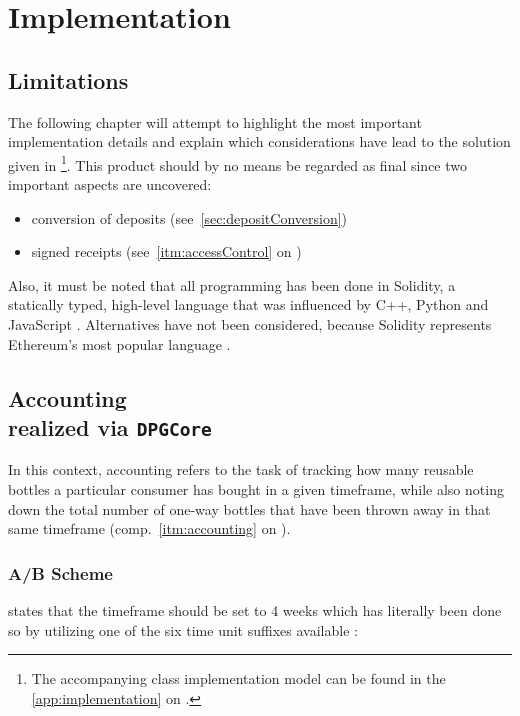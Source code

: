 
\chapter{Implementation}
\label{chp:implementation}

\section{Limitations}
The following chapter will attempt to highlight the most important implementation details and explain which considerations have lead to the solution given in \cite{depositRefundGitHub} \footnote{The accompanying class implementation model can be found in the \autoref{app:implementation} on .}. This product should by no means be regarded as final since two important aspects are uncovered:

\begin{itemize}
  \item conversion of deposits (see~\ref{sec:depositConversion})
  \item signed receipts (see~\ref{itm:accessControl} on )
\end{itemize}

Also, it must be noted that all programming has been done in Solidity, a statically typed, high-level language that was influenced by C++, Python and JavaScript \cite[p.~5]{solidityDocs}. Alternatives have not been considered, because Solidity represents Ethereum's most popular language \cite[p.~21]{Antonopoulos.2018}.

\pagebreak

\section[Accounting]{Accounting \\ {\normalsize realized via \texttt{DPGCore}}}

In this context, accounting refers to the task of tracking how many reusable bottles a particular consumer has bought in a given timeframe, while also noting down the total number of one-way bottles that have been thrown away in that same timeframe (comp.~\ref{itm:accounting} on ). 

\subsection{A/B Scheme}
 states that the timeframe should be set to 4 weeks which has literally been done so by utilizing one of the six time unit suffixes available \cite[p.~68]{solidityDocs}:

